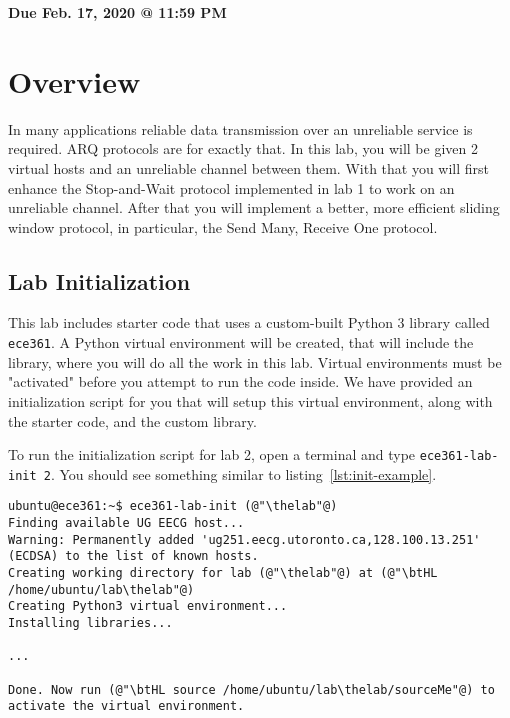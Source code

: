 \documentclass[11pt]{article}
\makeatletter
\def\thelab{2}
\def\datedue{Feb. 17, 2020 @ 11:59 PM}
\makeatother
\begin{document}
\maketitle \thispagestyle{fancy}
\hfill {\large \textbf{Due \datedue}}


\section{Overview}
\label{sec:overview}
In many applications reliable data transmission over an unreliable service is required. ARQ protocols are for exactly that. In this lab, you will be given 2 virtual hosts and an unreliable channel between them. With that you will first enhance the Stop-and-Wait protocol implemented in lab 1 to work on an unreliable channel. After that you will implement a better, more efficient sliding window protocol, in particular, the Send Many, Receive One protocol.

\subsection{Lab Initialization}
\label{subsec:lab-init}
This lab includes starter code that uses a custom-built Python 3 library called \texttt{ece361}. A Python virtual environment will be created, that will include the library, where you will do all the work in this lab. Virtual environments must be "activated" before you attempt to run the code inside. We have provided an initialization script for you that will setup this virtual environment, along with the starter code, and the custom library.


To run the initialization script for lab \thelab, open a terminal and type \texttt{ece361-lab-init \thelab}. You should see something similar to listing~\ref{lst:init-example}.
\begin{lstlisting}[style=ece361shell, caption={Initializing lab \thelab.}, label={lst:init-example}]
ubuntu@ece361:~$ ece361-lab-init (@"\thelab"@)
Finding available UG EECG host...
Warning: Permanently added 'ug251.eecg.utoronto.ca,128.100.13.251' (ECDSA) to the list of known hosts.
Creating working directory for lab (@"\thelab"@) at (@"\btHL /home/ubuntu/lab\thelab"@)
Creating Python3 virtual environment...
Installing libraries...

...

Done. Now run (@"\btHL source /home/ubuntu/lab\thelab/sourceMe"@) to activate the virtual environment.
\end{lstlisting}
\end{document}
